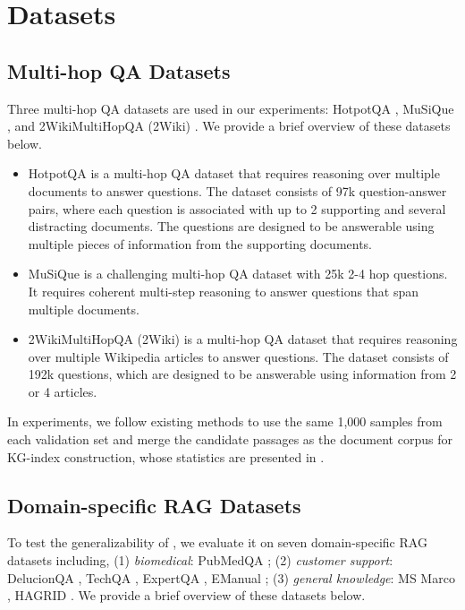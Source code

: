 \section{Datasets}\label{app:datasets}
\subsection{Multi-hop QA Datasets}\label{app:multi_hop_qa}
Three multi-hop QA datasets are used in our experiments: HotpotQA \cite{yang2018hotpotqa}, MuSiQue \cite{trivedi2022musique}, and 2WikiMultiHopQA (2Wiki) \cite{ho2020constructing}. We provide a brief overview of these datasets below.
\begin{itemize}
    \item HotpotQA \cite{yang2018hotpotqa} is a multi-hop QA dataset that requires reasoning over multiple documents to answer questions. The dataset consists of 97k question-answer pairs, where each question is associated with up to 2 supporting and several distracting documents. The questions are designed to be answerable using multiple pieces of information from the supporting documents.
    \item MuSiQue \cite{trivedi2022musique} is a challenging multi-hop QA dataset with 25k 2-4 hop questions. It requires coherent multi-step reasoning to answer questions that span multiple documents. 
    \item 2WikiMultiHopQA (2Wiki) \cite{ho2020constructing} is a multi-hop QA dataset that requires reasoning over multiple Wikipedia articles to answer questions. The dataset consists of 192k questions, which are designed to be answerable using information from 2 or 4 articles.
\end{itemize}
In experiments, we follow existing methods \cite{trivedi2023interleaving,gutiérrez2024hipporag} to use the same 1,000 samples from each validation set and merge the candidate passages as the document corpus for KG-index construction, whose statistics are presented in .

\subsection{Domain-specific RAG Datasets}\label{app:domain_specific}
To test the generalizability of \ourmethod, we evaluate it on seven domain-specific RAG datasets \cite{friel2024ragbench} including, (1) \emph{biomedical}: PubMedQA \cite{jin-etal-2019-pubmedqa}; (2) \emph{customer support}: DelucionQA \cite{sadat-etal-2023-delucionqa}, TechQA \cite{castelli-etal-2020-techqa}, ExpertQA \cite{malaviya2023expertqa}, EManual \cite{nandy-etal-2021-question-answering}; (3) \emph{general knowledge}: MS Marco \cite{nguyen2016ms}, HAGRID \cite{kamalloo2023hagrid}. We provide a brief overview of these datasets below.

